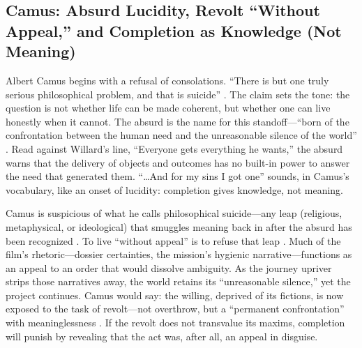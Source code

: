 \subsection*{Camus: Absurd Lucidity, Revolt ``Without Appeal,'' and Completion as Knowledge
	(Not Meaning)}
\label{ssec:iii-camus}
Albert Camus begins with a refusal of consolations. ``There is but one truly serious philosophical
problem, and that is suicide'' \parencite[p.~3]{CamusMyth1991}. The claim sets the tone: the
question is not whether life can be made coherent, but whether one can live honestly when it
cannot. The absurd is the name for this standoff—``born of the confrontation between the human
need and the unreasonable silence of the world'' \parencite[p.~28]{CamusMyth1991}. Read against
Willard's line, ``Everyone gets everything he wants,'' the absurd warns that the delivery of
objects and outcomes has no built-in power to answer the need that generated them. ``\ldots And
for my sins I got one'' sounds, in Camus's vocabulary, like an onset of lucidity: completion
gives knowledge, not meaning.

Camus is suspicious of what he calls philosophical suicide—any leap (religious, metaphysical,
or ideological) that smuggles meaning back in after the absurd has been recognized
\parencite[pp.~53--58]{CamusMyth1991}. To live ``without appeal'' is to refuse that leap
\parencite[p.~54]{CamusMyth1991}. Much of the film's rhetoric—dossier certainties, the mission's
hygienic narrative—functions as an appeal to an order that would dissolve ambiguity. As the
journey upriver strips those narratives away, the world retains its ``unreasonable silence,''
yet the project continues. Camus would say: the willing, deprived of its fictions, is now
exposed to the task of revolt—not overthrow, but a ``permanent confrontation'' with
meaninglessness \parencite[p.~55]{CamusMyth1991}. If the revolt does not transvalue its maxims,
completion will punish by revealing that the act was, after all, an appeal in disguise.

